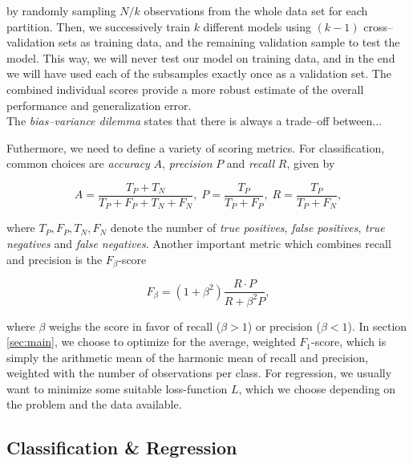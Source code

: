 by randomly sampling $N/k$ observations from the whole data set for each partition. Then, we successively train $k$ different models using $(k-1)$ cross--validation sets as training data, and the remaining validation sample to test the model. This way, we will never test our model on training data, and in the end we will have used each of the subsamples exactly once as a validation set. The combined individual scores provide a more robust estimate of the overall performance and generalization error.\\

The \emph{bias--variance dilemma} states that there is always a trade--off between...



Futhermore, we need to define a variety of scoring metrics. For classification, common choices are \emph{accuracy} $A$, \emph{precision} $P$ and \emph{recall} $R$, given by

\begin{equation}
A = \frac{T_P + T_N}{T_P + F_P + T_N + F_N}, \; P = \frac{T_P}{T_P + F_P}, \; R = \frac{T_P}{T_P + F_N},
\end{equation}

where $T_P, F_P, T_N, F_N$ denote the number of \emph{true positives}, \emph{false positives}, \emph{true negatives} and \emph{false negatives}. Another important metric which combines recall and precision is the $F_\beta$-score

\begin{equation}
\label{eq:f-beta-score}
F_\beta = (1 + \beta^2) \frac{R \cdot P}{R + \beta^2 P},
\end{equation}

where $\beta$ weighs the score in favor of recall ($\beta > 1$) or precision ($\beta < 1$). In section \ref{sec:main}, we choose to optimize for the average, weighted $F_1$-score, which is simply the arithmetic mean of the harmonic mean of recall and precision, weighted with the number of observations per class. For regression, we usually want to minimize some suitable loss-function $L$, which we choose depending on the problem and the data available.

\subsection{Classification \& Regression}

